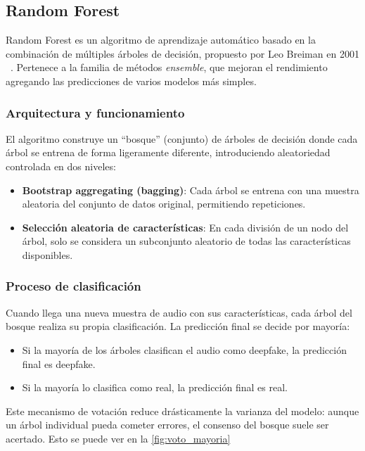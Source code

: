 \subsection{Random Forest}
\label{subsubsec:eda_rf}

Random Forest es un algoritmo de aprendizaje automático basado en la combinación de múltiples árboles de decisión, propuesto por Leo Breiman en 2001 ~\parencite{2001randomforest}. Pertenece a la familia de métodos \textit{ensemble}, que mejoran el rendimiento agregando las predicciones de varios modelos más simples.

\subsubsection*{Arquitectura y funcionamiento}

El algoritmo construye un ``bosque'' (conjunto) de árboles de decisión donde cada árbol se entrena de forma ligeramente diferente, introduciendo aleatoriedad controlada en dos niveles:

\begin{itemize}
    \item \textbf{Bootstrap aggregating (bagging)}: Cada árbol se entrena con una muestra aleatoria del conjunto de datos original, permitiendo repeticiones.
    
    \item \textbf{Selección aleatoria de características}: En cada división de un nodo del árbol, solo se considera un subconjunto aleatorio de todas las características disponibles.
\end{itemize}

\subsubsection*{Proceso de clasificación}

Cuando llega una nueva muestra de audio con sus características, cada árbol del bosque realiza su propia clasificación. La predicción final se decide por mayoría:

\begin{itemize}
    \item Si la mayoría de los árboles clasifican el audio como deepfake, la predicción final es deepfake.
    \item Si la mayoría lo clasifica como real, la predicción final es real.
\end{itemize}

Este mecanismo de votación reduce drásticamente la varianza del modelo: aunque un árbol individual pueda cometer errores, el consenso del bosque suele ser acertado. Esto se puede ver en la \autoref{fig:voto_mayoria}

